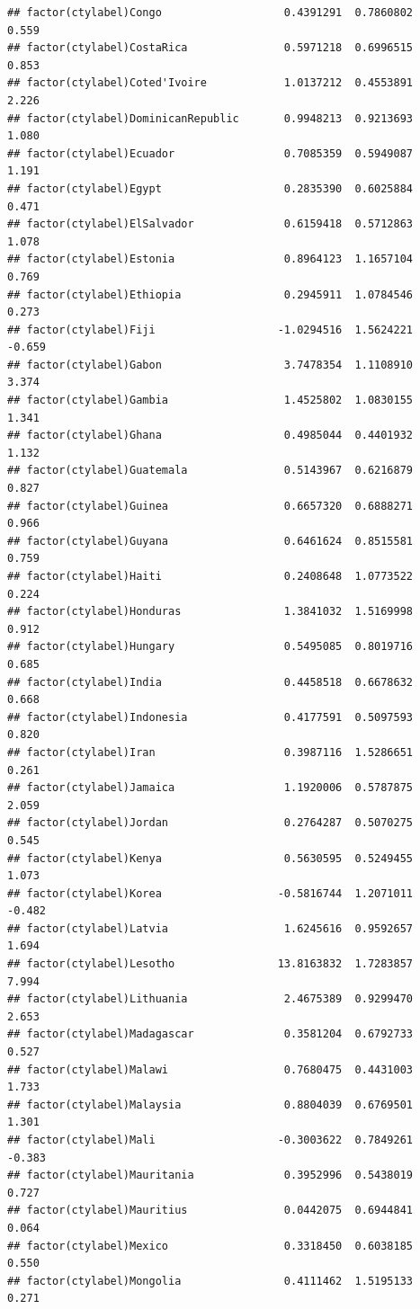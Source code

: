 \documentclass[12pt]{article}\usepackage[]{graphicx}\usepackage[]{color}
\makeatletter
\newenvironment{kframe}{%
 \def\at@end@of@kframe{}%
 \ifinner\ifhmode%
  \def\at@end@of@kframe{\end{minipage}}%
  \begin{minipage}{\columnwidth}%
 \fi\fi%
 \def\FrameCommand##1{\hskip\@totalleftmargin \hskip-\fboxsep
 \colorbox{shadecolor}{##1}\hskip-\fboxsep
     \hskip-\linewidth \hskip-\@totalleftmargin \hskip\columnwidth}%
 \MakeFramed {\advance\hsize-\width
   \@totalleftmargin\z@ \linewidth\hsize
   \@setminipage}}%
 {\par\unskip\endMakeFramed%
 \at@end@of@kframe}
\newenvironment{knitrout}{}{} %
\makeatother
\begin{document}
\begin{knitrout}
\begin{kframe}
\begin{verbatim}
## factor(ctylabel)Congo                   0.4391291  0.7860802   0.559
## factor(ctylabel)CostaRica               0.5971218  0.6996515   0.853
## factor(ctylabel)Coted'Ivoire            1.0137212  0.4553891   2.226
## factor(ctylabel)DominicanRepublic       0.9948213  0.9213693   1.080
## factor(ctylabel)Ecuador                 0.7085359  0.5949087   1.191
## factor(ctylabel)Egypt                   0.2835390  0.6025884   0.471
## factor(ctylabel)ElSalvador              0.6159418  0.5712863   1.078
## factor(ctylabel)Estonia                 0.8964123  1.1657104   0.769
## factor(ctylabel)Ethiopia                0.2945911  1.0784546   0.273
## factor(ctylabel)Fiji                   -1.0294516  1.5624221  -0.659
## factor(ctylabel)Gabon                   3.7478354  1.1108910   3.374
## factor(ctylabel)Gambia                  1.4525802  1.0830155   1.341
## factor(ctylabel)Ghana                   0.4985044  0.4401932   1.132
## factor(ctylabel)Guatemala               0.5143967  0.6216879   0.827
## factor(ctylabel)Guinea                  0.6657320  0.6888271   0.966
## factor(ctylabel)Guyana                  0.6461624  0.8515581   0.759
## factor(ctylabel)Haiti                   0.2408648  1.0773522   0.224
## factor(ctylabel)Honduras                1.3841032  1.5169998   0.912
## factor(ctylabel)Hungary                 0.5495085  0.8019716   0.685
## factor(ctylabel)India                   0.4458518  0.6678632   0.668
## factor(ctylabel)Indonesia               0.4177591  0.5097593   0.820
## factor(ctylabel)Iran                    0.3987116  1.5286651   0.261
## factor(ctylabel)Jamaica                 1.1920006  0.5787875   2.059
## factor(ctylabel)Jordan                  0.2764287  0.5070275   0.545
## factor(ctylabel)Kenya                   0.5630595  0.5249455   1.073
## factor(ctylabel)Korea                  -0.5816744  1.2071011  -0.482
## factor(ctylabel)Latvia                  1.6245616  0.9592657   1.694
## factor(ctylabel)Lesotho                13.8163832  1.7283857   7.994
## factor(ctylabel)Lithuania               2.4675389  0.9299470   2.653
## factor(ctylabel)Madagascar              0.3581204  0.6792733   0.527
## factor(ctylabel)Malawi                  0.7680475  0.4431003   1.733
## factor(ctylabel)Malaysia                0.8804039  0.6769501   1.301
## factor(ctylabel)Mali                   -0.3003622  0.7849261  -0.383
## factor(ctylabel)Mauritania              0.3952996  0.5438019   0.727
## factor(ctylabel)Mauritius               0.0442075  0.6944841   0.064
## factor(ctylabel)Mexico                  0.3318450  0.6038185   0.550
## factor(ctylabel)Mongolia                0.4111462  1.5195133   0.271

\end{verbatim}
\end{kframe}
\end{knitrout}
\end{document}
